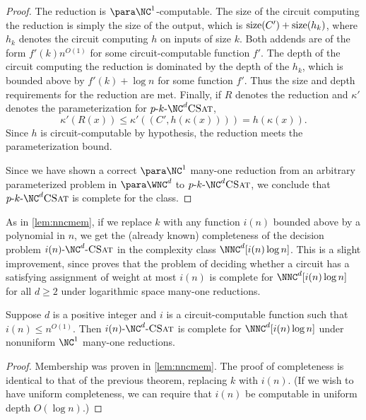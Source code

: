 \begin{proof}
  The reduction is $\para \NC^1$-computable.
  The size of the circuit computing the reduction is simply the size of the output, which is $\operatorname{size}(C') + \operatorname{size}(h_k)$, where $h_k$ denotes the circuit computing $h$ on inputs of size $k$.
  Both addends are of the form $f'(k) n^{O(1)}$ for some circuit-computable function $f'$.
  The depth of the circuit computing the reduction is dominated by the depth of the $h_k$, which is bounded above by $f'(k) + \log n$ for some function $f'$.
  Thus the size and depth requirements for the reduction are met.
  Finally, if $R$ denotes the reduction and $\kappa'$ denotes the parameterization for $\pNCSAT$,
  \[
  \kappa'(R(x)) \leq \kappa'((C', h(\kappa(x)))) = h(\kappa(x)).
  \]
  Since $h$ is circuit-computable by hypothesis, the reduction meets the parameterization bound.

  Since we have shown a correct $\para \NC^1$ many-one reduction from an arbitrary parameterized problem in $\para \WNC^d$ to $\pNCSAT$, we conclude that $\pNCSAT$ is complete for the class.
\end{proof}

As in \autoref{lem:nncmem}, if we replace $k$ with any function $i(n)$ bounded above by a polynomial in $n$, we get the (already known) completeness of the decision problem $\iNCSAT$ in the complexity class $\NNC^d[i(n) \log n]$.
This is a slight improvement, since \autocite[Theorem~3.6]{cc97lim} proves that the problem of deciding whether a circuit has a satisfying assignment of weight at most $i(n)$ is complete for $\NNC^d[i(n) \log n]$ for all $d \geq 2$ under logarithmic space many-one reductions.

\begin{corollary}\label{cor:nnccomplete}
  Suppose $d$ is a positive integer and $i$ is a circuit-computable function such that $i(n) \leq n^{O(1)}$.
  Then $\iNCSAT$ is complete for $\NNC^d[i(n) \log n]$ under nonuniform $\NC^1$ many-one reductions.
\end{corollary}
\begin{proof}
  Membership was proven in \autoref{lem:nncmem}.
  The proof of completeness is identical to that of the previous theorem, replacing $k$ with $i(n)$.
  (If we wish to have uniform completeness, we can require that $i(n)$ be computable in uniform depth $O(\log n)$.)
\end{proof}


